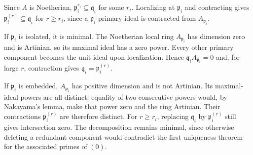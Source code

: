 Since $A$ is Noetherian, $\mathfrak p_i^{r_i}\subseteq\mathfrak q_i$ for some $r_i$. Localizing at $\mathfrak p_i$ and contracting gives $\mathfrak p_i^{(r)}\subseteq\mathfrak q_i$ for $r\geq r_i$, since a $\mathfrak p_i$-primary ideal is contracted from $A_{\mathfrak p_i}$.

If $\mathfrak p_i$ is isolated, it is minimal. The Noetherian local ring $A_{\mathfrak p_i}$ has dimension zero and is Artinian, so its maximal ideal has a zero power. Every other primary component becomes the unit ideal upon localization. Hence $\mathfrak q_iA_{\mathfrak p_i}=0$ and, for large $r$, contraction gives $\mathfrak q_i=\mathfrak p_i^{(r)}$.

If $\mathfrak p_i$ is embedded, $A_{\mathfrak p_i}$ has positive dimension and is not Artinian. Its maximal-ideal powers are all distinct: equality of two consecutive powers would, by Nakayama's lemma, make that power zero and the ring Artinian. Their contractions $\mathfrak p_i^{(r)}$ are therefore distinct. For $r\geq r_i$, replacing $\mathfrak q_i$ by $\mathfrak p_i^{(r)}$ still gives intersection zero. The decomposition remains minimal, since otherwise deleting a redundant component would contradict the first uniqueness theorem for the associated primes of $(0)$.
